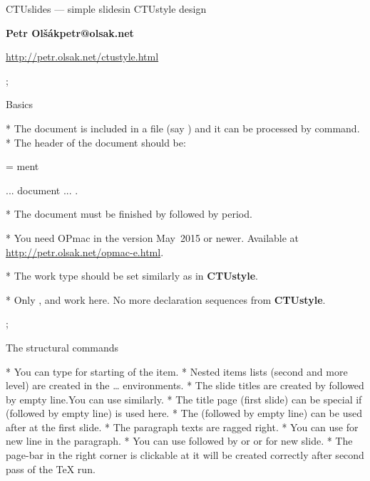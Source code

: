 

\worktype[O/EN]

\slideshow 

\tit CTUslides ---\nl 
     simple slides\nl in CTUstyle design

\subtit\bf Petr Ol\v s\'ak\nl petr@olsak.net

\subtit\rm \url{http://petr.olsak.net/ctustyle.html}

\pg; %

\sec Basics

* The document is included in a file (say )\nl
  and it can be processed by  command.
* The header of the document should be:

\pg=\typosize[13/15]\begtt
\worktype[B/EN]   %
ment

\slideshow        %
... document ...
\pg.
\endtt

* The document must be finished by \code{\\pg} followed by period.

* You need OPmac in the version May~2015 or newer.
  Available at \url{http://petr.olsak.net/opmac-e.html}.

* The work type should be set similarly as in {\bf\Blue CTUstyle}.

* Only \code{\\worktype}, \code{\\faculty} and \code{\\department}
  work here. No more declaration sequences from {\bf\Blue CTUstyle}.

\pg; %

\sec The structural commands

* You can type \code{\*} for starting of the item.
* Nested items lists (second and more level) are created in
  the \code{\\begitems}\dots\code{\\enditems} environments.
* The slide titles are created by 
  followed by empty line.\nl You can use  similarly.
* The title page (first slide) can be special if \nl
  (followed by empty line) is used here.
* The  (followed by empty line)
  can be used after \code{\\tit} at the first slide.
* The paragraph texts are ragged right.
* You can use \code{\\nl} for new line in the paragraph.
* You can use \code{\\pg} followed by \code{+} or \code{,} or 
  for new slide.
* The page-bar in the right corner is clickable at it will be 
  created correctly after second pass of the \TeX{} run.

